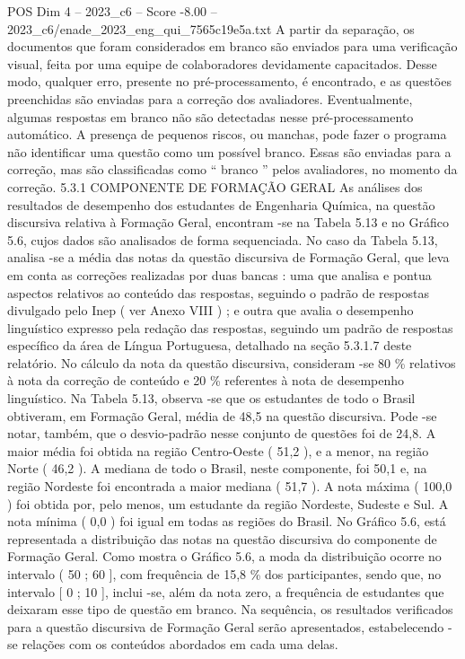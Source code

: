 \begin{textsample}{POS Dim 4 – 2023\_c6 – Score -8.00 – 2023\_c6/enade\_2023\_eng\_qui\_7565c19e5a.txt}
A partir da separação, os documentos que foram considerados em branco são enviados para uma verificação visual, feita por uma equipe de colaboradores devidamente capacitados.
Desse modo, qualquer erro, presente no pré-processamento, é encontrado, e as questões preenchidas são enviadas para a correção dos avaliadores.
Eventualmente, algumas respostas em branco não são detectadas nesse pré-processamento automático.
A presença de pequenos riscos, ou manchas, pode fazer o programa não identificar uma questão como um possível branco.
Essas são enviadas para a correção, mas são classificadas como “ branco ” pelos avaliadores, no momento da correção. 5.3.1 COMPONENTE DE FORMAÇÃO GERAL As análises dos resultados de desempenho dos estudantes de Engenharia Química, na questão discursiva relativa à Formação Geral, encontram -se na Tabela 5.13 e no Gráfico 5.6, cujos dados são analisados de forma sequenciada.
No caso da Tabela 5.13, analisa -se a média das notas da questão discursiva de Formação Geral, que leva em conta as correções realizadas por duas bancas : uma que analisa e pontua aspectos relativos ao conteúdo das respostas, seguindo o padrão de respostas divulgado pelo Inep ( ver Anexo VIII ) ; e outra que avalia o desempenho linguístico expresso pela redação das respostas, seguindo um padrão de respostas específico da área de Língua Portuguesa, detalhado na seção 5.3.1.7 deste relatório.
No cálculo da nota da questão discursiva, consideram -se 80 \% relativos à nota da correção de conteúdo e 20 \% referentes à nota de desempenho linguístico.
Na Tabela 5.13, observa -se que os estudantes de todo o Brasil obtiveram, em Formação Geral, média de 48,5 na questão discursiva.
Pode -se notar, também, que o desvio-padrão nesse conjunto de questões foi de 24,8.
A maior média foi obtida na região Centro-Oeste ( 51,2 ), e a menor, na região Norte ( 46,2 ).
A mediana de todo o Brasil, neste componente, foi 50,1 e, na região Nordeste foi encontrada a maior mediana ( 51,7 ).
A nota máxima ( 100,0 ) foi obtida por, pelo menos, um estudante da região Nordeste, Sudeste e Sul.
A nota mínima ( 0,0 ) foi igual em todas as regiões do Brasil.
No Gráfico 5.6, está representada a distribuição das notas na questão discursiva do componente de Formação Geral.
Como mostra o Gráfico 5.6, a moda da distribuição ocorre no intervalo ( 50 ; 60 ], com frequência de 15,8 \% dos participantes, sendo que, no intervalo [ 0 ; 10 ], inclui -se, além da nota zero, a frequência de estudantes que deixaram esse tipo de questão em branco.
Na sequência, os resultados verificados para a questão discursiva de Formação Geral serão apresentados, estabelecendo -se relações com os conteúdos abordados em cada uma delas.

\end{textsample}
